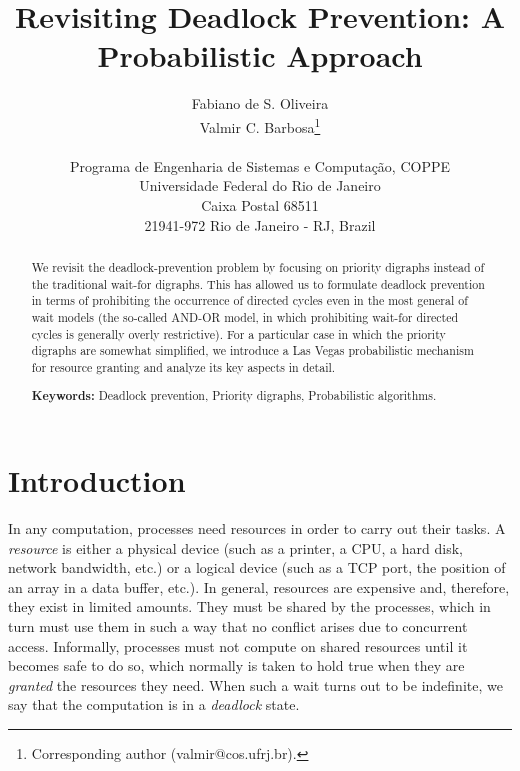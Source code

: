 \documentclass{article}
\begin{document}
\title{Revisiting Deadlock Prevention: A Probabilistic Approach}

\author{Fabiano de S. Oliveira\\
Valmir C. Barbosa\thanks{Corresponding author (valmir@cos.ufrj.br).}\\
\\
Programa de Engenharia de Sistemas e Computa\c c\~ao, COPPE\\
Universidade Federal do Rio de Janeiro\\
Caixa Postal 68511\\
21941-972 Rio de Janeiro - RJ, Brazil}

\date{}

\maketitle

\begin{abstract}
We revisit the deadlock-prevention problem by focusing on priority digraphs
instead of the traditional wait-for digraphs. This has allowed us to formulate
deadlock prevention in terms of prohibiting the occurrence of directed cycles
even in the most general of wait models (the so-called AND-OR model, in which
prohibiting wait-for directed cycles is generally overly restrictive). For a
particular case in which the priority digraphs are somewhat simplified, we
introduce a Las Vegas probabilistic mechanism for resource granting and analyze
its key aspects in detail.

\bigskip
\noindent
\textbf{Keywords:}
Deadlock prevention, Priority digraphs, Probabilistic algorithms.
\end{abstract}

\section{Introduction}

In any computation, processes need resources in order to carry out their tasks.
A \emph{resource} is either a physical device (such as a printer, a CPU, a hard
disk, network bandwidth, etc.) or a logical device (such as a TCP port, the
position of an array in a data buffer, etc.). In general, resources are
expensive and, therefore, they exist in limited amounts. They must be shared by
the processes, which in turn must use them in such a way that no conflict arises
due to concurrent access. Informally, processes must not compute on shared
resources until it becomes safe to do so, which normally is taken to hold true
when they are \emph{granted} the resources they need. When such a wait turns out
to be indefinite, we say that the computation is in a \emph{deadlock} state. 
\end{document}
